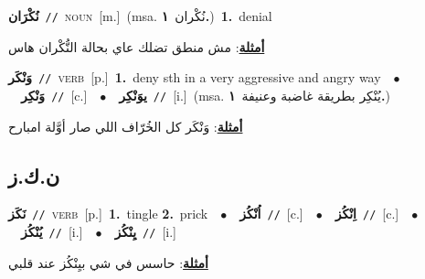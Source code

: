 \documentclass[10pt,a4paper,twoside]{article} %
\begin{document}
\begin{multicols}{2}
{\setlength\topsep{0pt}\textbf{\foreignlanguage{arabic}{نُكْرَان}}\ {\color{gray}\texttt{//}\color{black}}\ \textsc{noun}\ [m.]\ \color{gray}(msa. \foreignlanguage{arabic}{نُكْران}~\foreignlanguage{arabic}{\textbf{١.}})\color{black}\ \textbf{1.}~denial\  \begin{flushright}\color{gray}\foreignlanguage{arabic}{\textbf{\underline{\foreignlanguage{arabic}{أمثلة}}}: مش منطق تضلك عاي بحالة النُّكْران هاس}\end{flushright}\color{black}} \vspace{2mm}

{\setlength\topsep{0pt}\textbf{\foreignlanguage{arabic}{وَنْكَر}}\ {\color{gray}\texttt{//}\color{black}}\ \textsc{verb}\ [p.]\ \textbf{1.}~deny sth in a very aggressive and angry way\ \ $\bullet$\ \ \setlength\topsep{0pt}\textbf{\foreignlanguage{arabic}{وَنْكِر}}\ {\color{gray}\texttt{//}\color{black}}\ [c.]\ \ $\bullet$\ \ \setlength\topsep{0pt}\textbf{\foreignlanguage{arabic}{يوَنْكِر}}\ {\color{gray}\texttt{//}\color{black}}\ [i.]\ \color{gray}(msa. \foreignlanguage{arabic}{يُنْكِر بطريقة غاضبة وعنيفة}~\foreignlanguage{arabic}{\textbf{١.}})\color{black}\  \begin{flushright}\color{gray}\foreignlanguage{arabic}{\textbf{\underline{\foreignlanguage{arabic}{أمثلة}}}: وَنْكَر كل الخُرّاف اللي صار أوَّلة امبارح}\end{flushright}\color{black}} \vspace{2mm}

\vspace{-3mm}
\subsection*{\color{blue}\foreignlanguage{arabic}{ن.ك.ز}\color{blue}{}} 

{\setlength\topsep{0pt}\textbf{\foreignlanguage{arabic}{نَكَز}}\ {\color{gray}\texttt{//}\color{black}}\ \textsc{verb}\ [p.]\ \textbf{1.}~tingle  \textbf{2.}~prick\ \ $\bullet$\ \ \setlength\topsep{0pt}\textbf{\foreignlanguage{arabic}{اُنْكُز}}\ {\color{gray}\texttt{//}\color{black}}\ [c.]\ \ $\bullet$\ \ \setlength\topsep{0pt}\textbf{\foreignlanguage{arabic}{اِنْكُز}}\ {\color{gray}\texttt{//}\color{black}}\ [c.]\ \ $\bullet$\ \ \setlength\topsep{0pt}\textbf{\foreignlanguage{arabic}{يُنْكُز}}\ {\color{gray}\texttt{//}\color{black}}\ [i.]\ \ $\bullet$\ \ \setlength\topsep{0pt}\textbf{\foreignlanguage{arabic}{يِنْكُز}}\ {\color{gray}\texttt{//}\color{black}}\ [i.]\  \begin{flushright}\color{gray}\foreignlanguage{arabic}{\textbf{\underline{\foreignlanguage{arabic}{أمثلة}}}: حاسس في شي بيِنْكُز عند قلبي}\end{flushright}\color{black}} \vspace{2mm}


\end{multicols}
\end{document}
